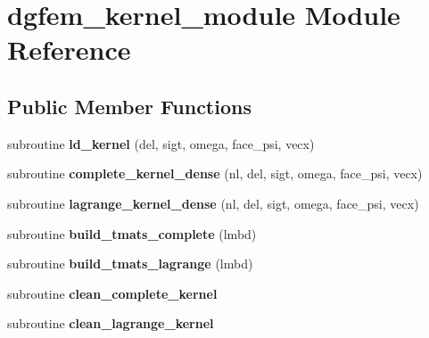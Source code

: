 \hypertarget{classdgfem__kernel__module}{\section{dgfem\-\_\-kernel\-\_\-module Module Reference}
\label{classdgfem__kernel__module}
}
\subsection*{Public Member Functions}
\begin{DoxyCompactItemize}
\item 
\hypertarget{classdgfem__kernel__module_ab2895739fbca15c13bfc209f2a9f56c1}{subroutine {\bfseries ld\-\_\-kernel} (del, sigt, omega, face\-\_\-psi, vecx)}\label{classdgfem__kernel__module_ab2895739fbca15c13bfc209f2a9f56c1}

\item 
\hypertarget{classdgfem__kernel__module_ae9af8c276042e07c95df3223a2efba18}{subroutine {\bfseries complete\-\_\-kernel\-\_\-dense} (nl, del, sigt, omega, face\-\_\-psi, vecx)}\label{classdgfem__kernel__module_ae9af8c276042e07c95df3223a2efba18}

\item 
\hypertarget{classdgfem__kernel__module_a695419069631a5882cef0dd9320ef81b}{subroutine {\bfseries lagrange\-\_\-kernel\-\_\-dense} (nl, del, sigt, omega, face\-\_\-psi, vecx)}\label{classdgfem__kernel__module_a695419069631a5882cef0dd9320ef81b}

\item 
\hypertarget{classdgfem__kernel__module_ae8f2982412ffa7c942882499aee04ffd}{subroutine {\bfseries build\-\_\-tmats\-\_\-complete} (lmbd)}\label{classdgfem__kernel__module_ae8f2982412ffa7c942882499aee04ffd}

\item 
\hypertarget{classdgfem__kernel__module_a5c329bf38a7b02608a8bbc8daba555ca}{subroutine {\bfseries build\-\_\-tmats\-\_\-lagrange} (lmbd)}\label{classdgfem__kernel__module_a5c329bf38a7b02608a8bbc8daba555ca}

\item 
\hypertarget{classdgfem__kernel__module_a9dd092be0f5af7f7456a89a064dc8efe}{subroutine {\bfseries clean\-\_\-complete\-\_\-kernel}}\label{classdgfem__kernel__module_a9dd092be0f5af7f7456a89a064dc8efe}

\item 
\hypertarget{classdgfem__kernel__module_a4cc0ad331dffcc26358eeb4a99ab36ac}{subroutine {\bfseries clean\-\_\-lagrange\-\_\-kernel}}\label{classdgfem__kernel__module_a4cc0ad331dffcc26358eeb4a99ab36ac}


\end{DoxyCompactItemize}

